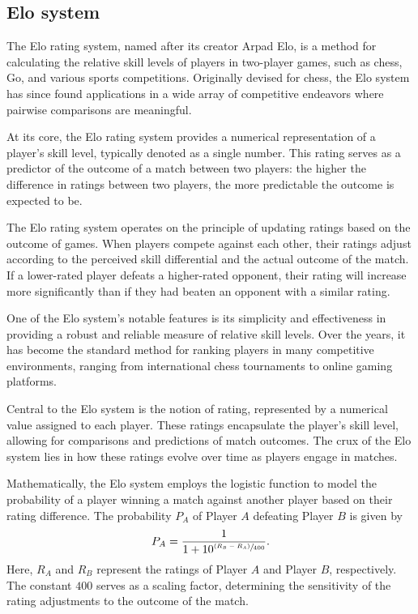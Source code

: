 \documentclass[preprint,aps,nofootinbib,a4paper,superscriptaddress,longbibliography,amsfonts,amssymb,amsmath,titlepage]{revtex4-2}
\begin{document}

\subsection{Elo system}

The Elo rating system, named after its creator Arpad Elo, is a method for calculating the relative skill levels of players in two-player games, such as chess, Go, and various sports competitions. Originally devised for chess, the Elo system has since found applications in a wide array of competitive endeavors where pairwise comparisons are meaningful.

At its core, the Elo rating system provides a numerical representation of a player's skill level, typically denoted as a single number. This rating serves as a predictor of the outcome of a match between two players: the higher the difference in ratings between two players, the more predictable the outcome is expected to be.

The Elo rating system operates on the principle of updating ratings based on the outcome of games. When players compete against each other, their ratings adjust according to the perceived skill differential and the actual outcome of the match. If a lower-rated player defeats a higher-rated opponent, their rating will increase more significantly than if they had beaten an opponent with a similar rating.

One of the Elo system's notable features is its simplicity and effectiveness in providing a robust and reliable measure of relative skill levels. Over the years, it has become the standard method for ranking players in many competitive environments, ranging from international chess tournaments to online gaming platforms.

Central to the Elo system is the notion of rating, represented by a numerical value assigned to each player. These ratings encapsulate the player's skill level, allowing for comparisons and predictions of match outcomes. The crux of the Elo system lies in how these ratings evolve over time as players engage in matches.

Mathematically, the Elo system employs the logistic function to model the probability of a player winning a match against another player based on their rating difference. The probability $P_A$ of Player $A$ defeating Player $B$ is given by
%
\begin{equation}
P_A = \frac{1}{1 + 10^{\sfrac{(R_B - R_A)}{400}}}.
\end{equation}
%
Here, $R_A$ and $R_B$ represent the ratings of Player $A$ and Player $B$, respectively. The constant $400$ serves as a scaling factor, determining the sensitivity of the rating adjustments to the outcome of the match.
\end{document}
